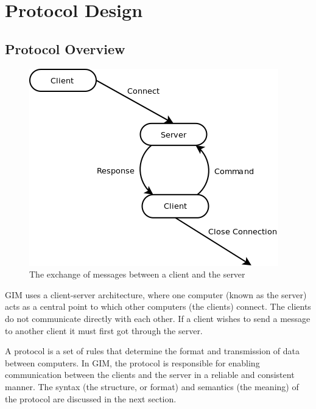 \newcommand\SLASH{\char`\\}

\section{Protocol Design}

\label{protocol_design}

\subsection{Protocol Overview}

\begin{figure}
    \begin{center}
        \includegraphics[scale=0.65]{Design/diagrams/protocol_high_level.png}
        \caption{The exchange of messages between a client and the server}
        \label{highLevelProtoDia}
    \end{center}
\end{figure}

GIM uses a client-server architecture, where one computer (known as the server) acts as a central point to which other computers (the clients) connect. The clients do not communicate directly with each other. If a client wishes to send a message to another client it must first got through the server.

A protocol is a set of rules that determine the format and transmission of data between computers. In GIM, the protocol is responsible for enabling communication between the clients and the server in a reliable and consistent manner.  The syntax (the structure, or format) and semantics (the meaning) of the protocol are discussed in the next section.


